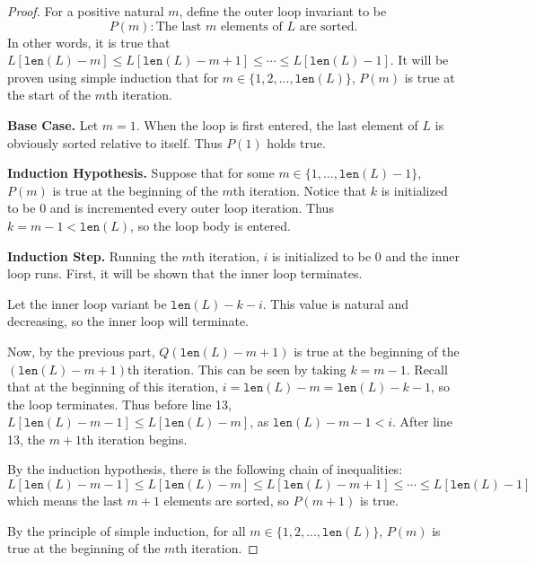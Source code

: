 \documentclass[11pt]{article}
\begin{document}
\begin{enumerate}[label=(\alph*)]
        \begin{proof}
            For a positive natural \(m\), define the outer loop invariant to be
            \[
                P(m) : \text{The last } m \text{ elements of } L \text{ are sorted.}
            \]
            In other words, it is true that \(L[\texttt{len}(L) - m] \leq L[\texttt{len}(L) - m + 1] \leq \cdots \leq L[\texttt{len}(L) - 1]\). It will be proven using simple induction that for \(m \in \{1, 2,..., \texttt{len}(L)\}\), \(P(m)\) is true at the start of the \(m\)th iteration.

            \textbf{Base Case.} Let \(m=1\). When the loop is first entered, the last element of \(L\) is obviously sorted relative to itself. Thus \(P(1)\) holds true.

            \textbf{Induction Hypothesis.} Suppose that for some \(m \in \{1,..., \texttt{len}(L) - 1\}\), \(P(m)\) is true at the beginning of the \(m\)th iteration. Notice that \(k\) is initialized to be 0 and is incremented every outer loop iteration. Thus \(k = m-1 < \texttt{len}(L)\), so the loop body is entered.

            \textbf{Induction Step.} Running the \(m\)th iteration, \(i\) is initialized to be 0 and the inner loop runs. First, it will be shown that the inner loop terminates.
            
            Let the inner loop variant be \(\texttt{len}(L) - k - i\). This value is natural and decreasing, so the inner loop will terminate.
            
            Now, by the previous part, \(Q(\texttt{len}(L) - m + 1)\) is true at the beginning of the \((\texttt{len}(L) - m + 1)\)th iteration. This can be seen by taking \(k=m-1\). Recall that at the beginning of this iteration, \(i = \texttt{len}(L) - m = \texttt{len}(L) - k - 1\), so the loop terminates. Thus before line 13, \(L[\texttt{len}(L) - m - 1]\leq L[\texttt{len}(L) - m]\), as \(\texttt{len}(L) - m - 1 < i\). After line 13, the \(m+1\)th iteration begins.

            By the induction hypothesis, there is the following chain of inequalities:
            \[
                L[\texttt{len}(L) - m - 1] \leq L[\texttt{len}(L) - m] \leq L[\texttt{len}(L) -m + 1] \leq \cdots \leq L[\texttt{len}(L) - 1]
            \]
            which means the last \(m+1\) elements are sorted, so \(P(m+1)\) is true.

            By the principle of simple induction, for all \(m \in \{1,2,...,\texttt{len}(L)\}\), \(P(m)\) is true at the beginning of the \(m\)th iteration.
        \end{proof}


\end{enumerate}
\end{document}
